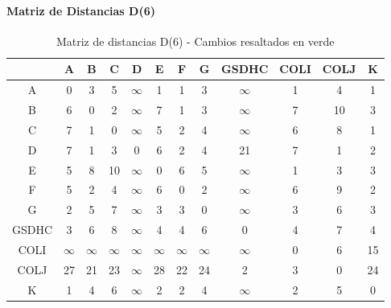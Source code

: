 \documentclass[12pt]{article}
\begin{document}
\paragraph{Matriz de Distancias D(6)}
\begin{table}[h!]
\centering
\begin{tabular}{|c|c|c|c|c|c|c|c|c|c|c|c|}
\hline
 & A & B & C & D & E & F & G & GSDHC & COLI & COLJ & K \\\hline
A & 0 & \cellcolor{lightgreen} 3 & \cellcolor{lightgreen} 5 & $\infty$ & 1 & 1 & \cellcolor{lightgreen} 3 & $\infty$ & 1 & 4 & 1 \\\hline
B & \cellcolor{lightgreen} 6 & 0 & 2 & $\infty$ & 7 & 1 & \cellcolor{lightgreen} 3 & $\infty$ & \cellcolor{lightgreen} 7 & 10 & 3 \\\hline
C & \cellcolor{lightgreen} 7 & 1 & 0 & $\infty$ & 5 & 2 & \cellcolor{lightgreen} 4 & $\infty$ & 6 & 8 & 1 \\\hline
D & \cellcolor{lightgreen} 7 & 1 & 3 & 0 & 6 & 2 & \cellcolor{lightgreen} 4 & 21 & 7 & 1 & 2 \\\hline
E & 5 & \cellcolor{lightgreen} 8 & \cellcolor{lightgreen} 10 & $\infty$ & 0 & 6 & 5 & $\infty$ & 1 & 3 & 3 \\\hline
F & 5 & 2 & 4 & $\infty$ & 6 & 0 & 2 & $\infty$ & 6 & 9 & 2 \\\hline
G & 2 & \cellcolor{lightgreen} 5 & \cellcolor{lightgreen} 7 & $\infty$ & 3 & 3 & 0 & $\infty$ & 3 & 6 & 3 \\\hline
GSDHC & 3 & \cellcolor{lightgreen} 6 & 8 & $\infty$ & 4 & 4 & \cellcolor{lightgreen} 6 & 0 & 4 & 7 & 4 \\\hline
COLI & $\infty$ & $\infty$ & $\infty$ & $\infty$ & $\infty$ & $\infty$ & $\infty$ & $\infty$ & 0 & 6 & 15 \\\hline
COLJ & \cellcolor{lightgreen} 27 & 21 & 23 & $\infty$ & 28 & 22 & \cellcolor{lightgreen} 24 & 2 & 3 & 0 & 24 \\\hline
K & 1 & \cellcolor{lightgreen} 4 & \cellcolor{lightgreen} 6 & $\infty$ & 2 & 2 & \cellcolor{lightgreen} 4 & $\infty$ & 2 & 5 & 0 \\\hline
\end{tabular}
\caption{Matriz de distancias D(6) - Cambios resaltados en verde}
\end{table}
\end{document}
